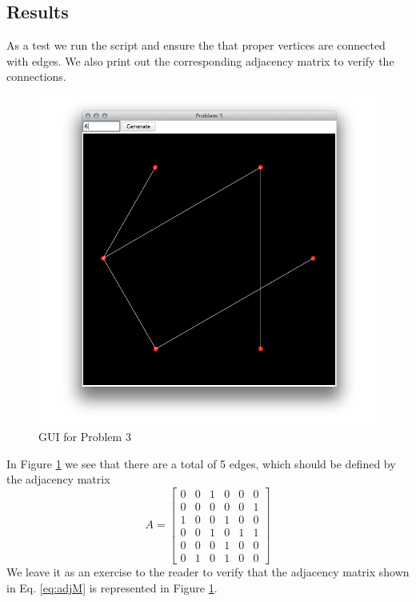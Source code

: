 \subsection{Results} %
\label{sub:results3}
As a test we run the script and ensure the that proper vertices are connected with edges. We also print out the corresponding adjacency matrix to verify the connections.
\begin{figure}[H]
    \centering
        \includegraphics[width=6in,trim=1in 1in 1in 1in]{include/prob3gui.png}
    \caption{GUI for Problem 3}
    \label{fig:include_prob3gui}
\end{figure}
In Figure \ref{fig:include_prob3gui} we see that there are a total of 5 edges, which should be defined by the adjacency matrix
\begin{equation}\label{eq:adjM}
    A = 
    \begin{bmatrix}
        0 & 0 & 1 & 0 & 0 & 0 \\
        0 & 0 & 0 & 0 & 0 & 1 \\
        1 & 0 & 0 & 1 & 0 & 0 \\
        0 & 0 & 1 & 0 & 1 & 1 \\
        0 & 0 & 0 & 1 & 0 & 0 \\
        0 & 1 & 0 & 1 & 0 & 0 
    \end{bmatrix}
\end{equation}
We leave it as an exercise to the reader to verify that the adjacency matrix shown in Eq. \ref{eq:adjM} is represented in Figure \ref{fig:include_prob3gui}.

